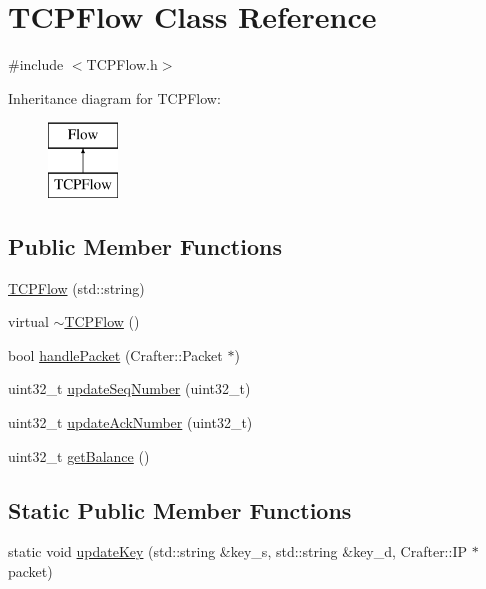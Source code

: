 \hypertarget{class_t_c_p_flow}{}\section{T\+C\+P\+Flow Class Reference}
\label{class_t_c_p_flow}


{\ttfamily \#include $<$T\+C\+P\+Flow.\+h$>$}

Inheritance diagram for T\+C\+P\+Flow\+:\begin{figure}[H]
\begin{center}
\leavevmode
\includegraphics[height=2.000000cm]{class_t_c_p_flow}
\end{center}
\end{figure}
\subsection*{Public Member Functions}
\begin{DoxyCompactItemize}
\item 
\hyperlink{class_t_c_p_flow_a7fe59ac4b0710567478252f8d4ad9bb1}{T\+C\+P\+Flow} (std\+::string)
\item 
virtual \hyperlink{class_t_c_p_flow_a365f33092bd2f25a149f77da0d29ad29}{$\sim$\+T\+C\+P\+Flow} ()
\item 
bool \hyperlink{class_t_c_p_flow_a3ff0dd52eb3f3660dcb092d47da1b2f5}{handle\+Packet} (Crafter\+::\+Packet $\ast$)
\item 
uint32\+\_\+t \hyperlink{class_t_c_p_flow_a85ad192ed9d9f981ba87f6b2f79edf2a}{update\+Seq\+Number} (uint32\+\_\+t)
\item 
uint32\+\_\+t \hyperlink{class_t_c_p_flow_a4fe05bb98dfa337784489cc669a79ea2}{update\+Ack\+Number} (uint32\+\_\+t)
\item 
uint32\+\_\+t \hyperlink{class_t_c_p_flow_a1b42d5a597eb1d337f217a0974f48ffe}{get\+Balance} ()
\end{DoxyCompactItemize}
\subsection*{Static Public Member Functions}
\begin{DoxyCompactItemize}
\item 
static void \hyperlink{class_t_c_p_flow_acebd32b83a41150d51c1fb0bd4d0dacf}{update\+Key} (std\+::string \&key\+\_\+s, std\+::string \&key\+\_\+d, Crafter\+::\+IP $\ast$packet)
\end{DoxyCompactItemize}
